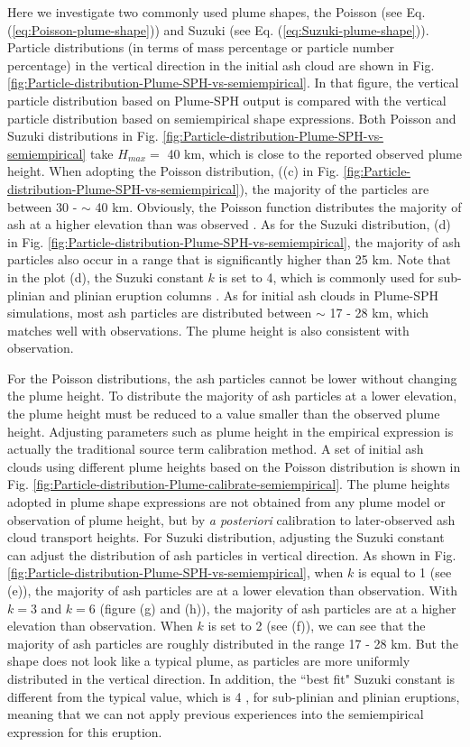 \documentclass[utf8]{frontiersSCNS} %
\begin{document}
Here we investigate two commonly used plume shapes, the Poisson (see
Eq. (\ref{eq:Poisson-plume-shape})) and Suzuki (see
Eq. (\ref{eq:Suzuki-plume-shape})).  Particle distributions (in terms
of mass percentage or particle number percentage) in the vertical
direction in the initial ash cloud are shown in
Fig. \ref{fig:Particle-distribution-Plume-SPH-vs-semiempirical}. In
that figure, the vertical particle distribution based on Plume-SPH
output is compared with the vertical particle distribution based on
semiempirical shape expressions. Both Poisson and Suzuki distributions
in Fig. \ref{fig:Particle-distribution-Plume-SPH-vs-semiempirical}
take $H_{max} =$ 40 km, which is close to the reported observed plume
height. When adopting the Poisson distribution, ((c) in
Fig. \ref{fig:Particle-distribution-Plume-SPH-vs-semiempirical}), the
majority of the particles are between 30 - $\sim$ 40 km. Obviously,
the Poisson function distributes the majority of ash at a higher
elevation than was observed \citep[e.g.][]{fero2008simulation}. As for
the Suzuki distribution, (d) in
Fig. \ref{fig:Particle-distribution-Plume-SPH-vs-semiempirical}, the
majority of ash particles also occur in a range that is significantly
higher than 25 km. Note that in the plot (d), the Suzuki constant $k$
is set to 4, which is commonly used for sub-plinian and plinian
eruption columns \citep{pfeiffer2005model}. As for initial ash clouds
in Plume-SPH simulations, most ash particles are distributed between
$\sim$ 17 - 28 km, which matches well with observations. The plume
height is also consistent with observation.

For the Poisson distributions, the ash particles cannot be lower without changing the plume height. To distribute the majority of ash particles at a lower elevation, the plume height must be reduced to a value smaller than the observed plume height. Adjusting parameters such as plume height in the empirical expression is actually the traditional source term calibration method. A set of initial ash clouds using different plume heights based on the Poisson distribution is shown in Fig. \ref{fig:Particle-distribution-Plume-calibrate-semiempirical}. The plume heights adopted in plume shape expressions are not obtained from any plume model or observation of plume height, but by \textit{a posteriori} calibration to later-observed ash cloud transport heights. For Suzuki distribution, adjusting the Suzuki constant can adjust the distribution of ash particles in vertical direction. As shown in Fig. \ref{fig:Particle-distribution-Plume-SPH-vs-semiempirical}, when $k$ is equal to 1 (see (e)), the majority of ash particles are at a lower elevation than observation. With $k=3$ and $k = 6$ (figure (g) and (h)), the majority of ash particles are at a higher elevation than observation. When $k$ is set to 2 (see (f)), we can see that the majority of  ash particles are roughly distributed in the range 17 - 28 km. But the shape does not look like a typical plume, as particles are more uniformly distributed in the vertical direction. In addition, the ``best fit" Suzuki constant is different from the typical value, which is 4 \citep{pfeiffer2005model}, for sub-plinian and plinian eruptions, meaning that we can not apply previous experiences into the semiempirical expression for this eruption.
\end{document}
